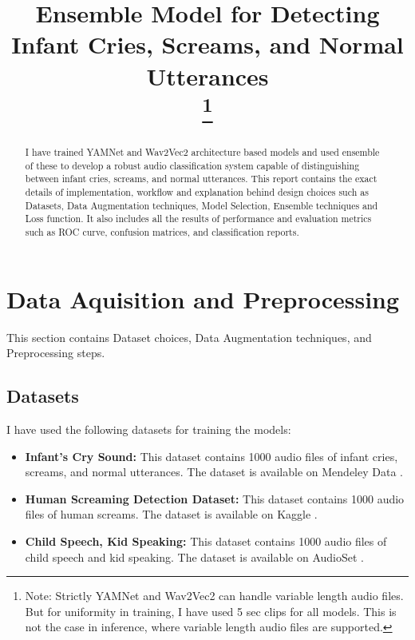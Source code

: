 \documentclass[conference]{IEEEtran}
\begin{document}
\title{Ensemble Model for Detecting Infant Cries, Screams, and Normal Utterances\\
\thanks{Note: Strictly YAMNet and Wav2Vec2 can handle variable length audio files. But for uniformity in training, I have used 5 sec clips for all models. This is not the case in inference, where variable length audio files are supported.}
}

\author{
}

\maketitle

\begin{abstract}
I have trained YAMNet and Wav2Vec2 architecture based models and used ensemble of these to develop a robust audio classification system capable of distinguishing
between infant cries, screams, and normal utterances. This report contains the exact details of implementation, workflow and explanation behind design choices such as Datasets, Data Augmentation techniques, Model Selection, Ensemble techniques and Loss function.
It also includes all the results of performance and evaluation metrics such as ROC curve, confusion matrices, and classification reports.
\end{abstract}

\section{Data Aquisition and Preprocessing}
This section contains Dataset choices, Data Augmentation techniques, and Preprocessing steps.

\subsection{Datasets}
I have used the following datasets for training the models:
\begin{itemize}
    \item \textbf{Infant's Cry Sound:} This dataset contains 1000 audio files of infant cries, screams, and normal utterances. The dataset is available on Mendeley Data \cite{dataset1}.
    \item \textbf{Human Screaming Detection Dataset:} This dataset contains 1000 audio files of human screams. The dataset is available on Kaggle \cite{dataset2}.
    \item \textbf{Child Speech, Kid Speaking:} This dataset contains 1000 audio files of child speech and kid speaking. The dataset is available on AudioSet \cite{dataset3}.
\end{itemize}
\end{document}
